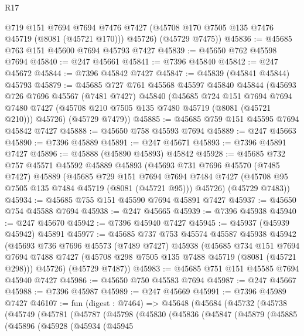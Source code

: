 \begin{lexlean}{R17}
\begin{coremodule}
        @719
        @151
        @7694
        @7694
        @7476
        @7427
        (@45708 @170 @7505 @135 @7476 @45719 (@8081 (@45721 @170)))
        @45726)
      (@45729 @7475))
@45836 := @45685 @763 @151 @45600 @7694 @45793 @7427
@45839 := @45650 @762 @45598 @7694
@45840 := @247 @45661
@45841 := @7396 @45840
@45842 := @247 @45672
@45844 := @7396 @45842 @7427
@45847 := @45839 (@45841 @45844) @45793
@45879 := @45685
    @727
    @761
    @45568
    @45597
    @45840
    @45844
    (@45693
      @726
      @7696
      @45567
      (@7481 @7427)
      @45840
      (@45685
        @724
        @151
        @7694
        @7694
        @7480
        @7427
        (@45708 @210 @7505 @135 @7480 @45719 (@8081 (@45721 @210)))
        @45726)
      (@45729 @7479))
@45885 := @45685 @759 @151 @45595 @7694 @45842 @7427
@45888 := @45650 @758 @45593 @7694
@45889 := @247 @45663
@45890 := @7396 @45889
@45891 := @247 @45671
@45893 := @7396 @45891 @7427
@45896 := @45888 (@45890 @45893) @45842
@45928 := @45685
    @732
    @757
    @45571
    @45592
    @45889
    @45893
    (@45693
      @731
      @7696
      @45570
      (@7485 @7427)
      @45889
      (@45685
        @729
        @151
        @7694
        @7694
        @7484
        @7427
        (@45708 @95 @7505 @135 @7484 @45719 (@8081 (@45721 @95)))
        @45726)
      (@45729 @7483))
@45934 := @45685 @755 @151 @45590 @7694 @45891 @7427
@45937 := @45650 @754 @45588 @7694
@45938 := @247 @45665
@45939 := @7396 @45938
@45940 := @247 @45670
@45942 := @7396 @45940 @7427
@45945 := @45937 (@45939 @45942) @45891
@45977 := @45685
    @737
    @753
    @45574
    @45587
    @45938
    @45942
    (@45693
      @736
      @7696
      @45573
      (@7489 @7427)
      @45938
      (@45685
        @734
        @151
        @7694
        @7694
        @7488
        @7427
        (@45708 @298 @7505 @135 @7488 @45719 (@8081 (@45721 @298)))
        @45726)
      (@45729 @7487))
@45983 := @45685 @751 @151 @45585 @7694 @45940 @7427
@45986 := @45650 @750 @45583 @7694
@45987 := @247 @45667
@45988 := @7396 @45987
@45989 := @247 @45669
@45991 := @7396 @45989 @7427
@46107 := fun (digest : @7464) =>
  @45648
    (@45684
      (@45732
        (@45738
          (@45749
            (@45781
              (@45787
                (@45798
                  (@45830
                    (@45836
                      (@45847
                        (@45879
                          (@45885
                            (@45896
                              (@45928
                                (@45934
                                  (@45945

\end{coremodule}
\end{lexlean}
